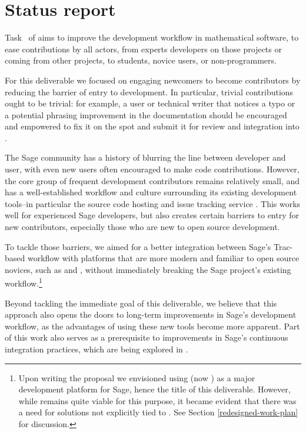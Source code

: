 \hypertarget{status-report}{%
\section{Status report}\label{status-report}}

Task~ of
 aims to improve the development workflow in
mathematical software, to ease contributions by all actors, from experts
developers on those projects or coming from other projects, to students, novice
users, or non-programmers.

For this deliverable we focused on engaging newcomers to become contributors by
reducing the barrier of entry to \Sage development. In particular, trivial
contributions ought to be trivial: for example, a user or technical writer that
notices a typo or a potential phrasing improvement in the documentation should
be encouraged and empowered to fix it on the spot and submit it for review and
integration into \Sage.

The Sage community has a history of blurring the line between developer and
user, with even new users often encouraged to make code contributions.
However, the core group of frequent development contributors remains relatively
small, and has a well-established workflow and culture surrounding its existing
development tools--in particular the source code hosting and issue tracking
service \Trac.  This works well for experienced Sage developers, but also
creates certain barriers to entry for new contributors, especially those who
are new to open source development.

To tackle those barriers, we aimed for a better integration between
Sage's Trac-based workflow with platforms that are more modern and
familiar to open source novices, such as \GitHub and \GitLab, without
immediately breaking the Sage project's existing workflow.\footnote{Upon
writing the proposal we envisioned using \SMC (now \cocalc) as a major
development platform for Sage, hence the title of this deliverable.  However,
while \cocalc remains quite viable for this purpose, it became evident that
there was a need for solutions not explicitly tied to \cocalc.  See Section
\ref{redesigned-work-plan} for discussion.}

Beyond tackling the immediate goal of this deliverable,
we believe that this approach also opens the doors to long-term
improvements in Sage's development workflow, as the advantages of using these
new tools become more apparent.  Part of this work also serves as a
prerequisite to improvements in Sage's continuous integration practices, which
are being explored in
.


